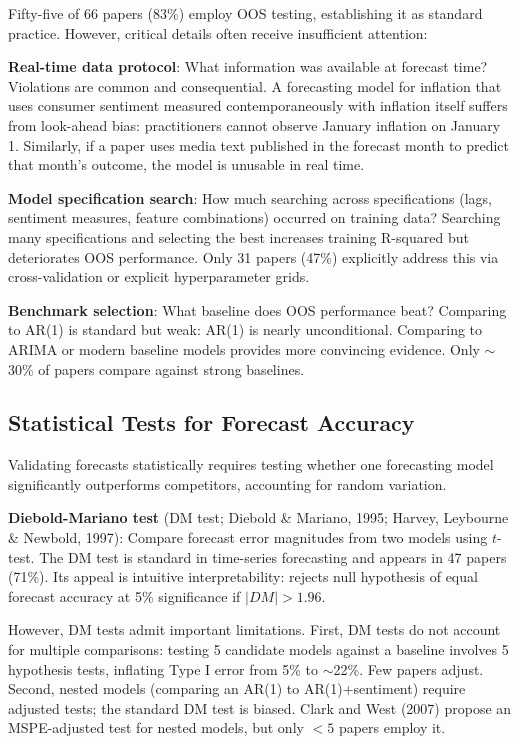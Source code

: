 \documentclass[11pt]{article}
\begin{document}
Fifty-five of 66 papers (83\%) employ OOS testing, establishing it as standard practice. However, critical details often receive insufficient attention:

\textbf{Real-time data protocol}: What information was available at forecast time? Violations are common and consequential. A forecasting model for inflation that uses consumer sentiment measured contemporaneously with inflation itself suffers from look-ahead bias: practitioners cannot observe January inflation on January 1. Similarly, if a paper uses media text published in the forecast month to predict that month's outcome, the model is unusable in real time.

\textbf{Model specification search}: How much searching across specifications (lags, sentiment measures, feature combinations) occurred on training data? Searching many specifications and selecting the best increases training R-squared but deteriorates OOS performance. Only 31 papers (47\%) explicitly address this via cross-validation or explicit hyperparameter grids.

\textbf{Benchmark selection}: What baseline does OOS performance beat? Comparing to AR(1) is standard but weak: AR(1) is nearly unconditional. Comparing to ARIMA or modern baseline models provides more convincing evidence. Only $\sim$30\% of papers compare against strong baselines.

\subsection{Statistical Tests for Forecast Accuracy}

Validating forecasts statistically requires testing whether one forecasting model significantly outperforms competitors, accounting for random variation.

\textbf{Diebold-Mariano test} (DM test; Diebold \& Mariano, 1995; Harvey, Leybourne \& Newbold, 1997): Compare forecast error magnitudes from two models using $t$-test. The DM test is standard in time-series forecasting and appears in 47 papers (71\%). Its appeal is intuitive interpretability: rejects null hypothesis of equal forecast accuracy at 5\% significance if $|DM| > 1.96$.

However, DM tests admit important limitations. First, DM tests do not account for multiple comparisons: testing 5 candidate models against a baseline involves 5 hypothesis tests, inflating Type I error from 5\% to $\sim$22\%. Few papers adjust. Second, nested models (comparing an AR(1) to AR(1)+sentiment) require adjusted tests; the standard DM test is biased. Clark and West (2007) propose an MSPE-adjusted test for nested models, but only $<5$ papers employ it.
\end{document}
